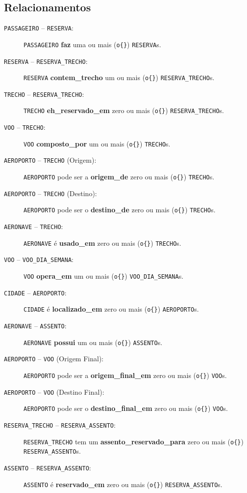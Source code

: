 \subsection*{Relacionamentos}
\begin{description}
    \item[\texttt{PASSAGEIRO} -- \texttt{RESERVA}:] \texttt{PASSAGEIRO} \textbf{faz} uma ou mais (\texttt{o\{\}}) \texttt{RESERVA}s.
    \item[\texttt{RESERVA} -- \texttt{RESERVA\_TRECHO}:] \texttt{RESERVA} \textbf{contem\_trecho} um ou mais (\texttt{o\{\}}) \texttt{RESERVA\_TRECHO}s.
    \item[\texttt{TRECHO} -- \texttt{RESERVA\_TRECHO}:] \texttt{TRECHO} \textbf{eh\_reservado\_em} zero ou mais (\texttt{o\{\}}) \texttt{RESERVA\_TRECHO}s.
    \item[\texttt{VOO} -- \texttt{TRECHO}:] \texttt{VOO} \textbf{composto\_por} um ou mais (\texttt{o\{\}}) \texttt{TRECHO}s.
    \item[\texttt{AEROPORTO} -- \texttt{TRECHO} (Origem):] \texttt{AEROPORTO} pode ser a \textbf{origem\_de} zero ou mais (\texttt{o\{\}}) \texttt{TRECHO}s.
    \item[\texttt{AEROPORTO} -- \texttt{TRECHO} (Destino):] \texttt{AEROPORTO} pode ser o \textbf{destino\_de} zero ou mais (\texttt{o\{\}}) \texttt{TRECHO}s.
    \item[\texttt{AERONAVE} -- \texttt{TRECHO}:] \texttt{AERONAVE} é \textbf{usado\_em} zero ou mais (\texttt{o\{\}}) \texttt{TRECHO}s.
    \item[\texttt{VOO} -- \texttt{VOO\_DIA\_SEMANA}:] \texttt{VOO} \textbf{opera\_em} um ou mais (\texttt{o\{\}}) \texttt{VOO\_DIA\_SEMANA}s.
    \item[\texttt{CIDADE} -- \texttt{AEROPORTO}:] \texttt{CIDADE} é \textbf{localizado\_em} zero ou mais (\texttt{o\{\}}) \texttt{AEROPORTO}s.
    \item[\texttt{AERONAVE} -- \texttt{ASSENTO}:] \texttt{AERONAVE} \textbf{possui} um ou mais (\texttt{o\{\}}) \texttt{ASSENTO}s.
    \item[\texttt{AEROPORTO} -- \texttt{VOO} (Origem Final):] \texttt{AEROPORTO} pode ser a \textbf{origem\_final\_em} zero ou mais (\texttt{o\{\}}) \texttt{VOO}s.
    \item[\texttt{AEROPORTO} -- \texttt{VOO} (Destino Final):] \texttt{AEROPORTO} pode ser o \textbf{destino\_final\_em} zero ou mais (\texttt{o\{\}}) \texttt{VOO}s.
    \item[\texttt{RESERVA\_TRECHO} -- \texttt{RESERVA\_ASSENTO}:] \texttt{RESERVA\_TRECHO} tem um \textbf{assento\_reservado\_para} zero ou mais (\texttt{o\{\}}) \texttt{RESERVA\_ASSENTO}s.
    \item[\texttt{ASSENTO} -- \texttt{RESERVA\_ASSENTO}:] \texttt{ASSENTO} é \textbf{reservado\_em} zero ou mais (\texttt{o\{\}}) \texttt{RESERVA\_ASSENTO}s.
\end{description}

